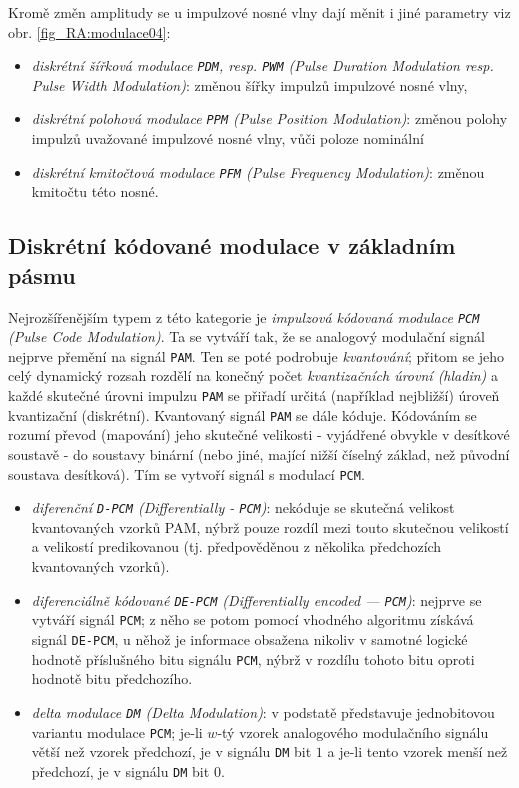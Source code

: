       Kromě změn amplitudy se u impulzové nosné vlny dají měnit i jiné parametry viz obr. 
      \ref{fig_RA:modulace04}:
      \begin{itemize}
        \item \emph{diskrétní šířková modulace \texttt{PDM}, resp. \texttt{PWM} (Pulse Duration  
              Modulation resp. Pulse Width Modulation)}: změnou šířky impulzů impulzové nosné vlny,
        \item \emph{diskrétní polohová modulace \texttt{PPM} (Pulse Position Modulation)}: změnou  
              polohy impulzů uvažované impulzové nosné vlny, vůči poloze nominální
        \item \emph{diskrétní kmitočtová modulace \texttt{PFM} (Pulse Frequency Modulation)}:  
              změnou kmitočtu této nosné.
      \end{itemize} 
    \subsection{Diskrétní kódované modulace v základním pásmu}
      Nejrozšířenějším typem z této kategorie je \emph{impulzová kódovaná modulace \texttt{PCM} 
      (Pulse Code Modulation)}. Ta se vytváří tak, že se analogový modulační signál nejprve přemění 
      na signál \texttt{PAM}. Ten se poté podrobuje \emph{kvantování}; přitom se jeho celý 
      dynamický rozsah rozdělí na konečný počet \emph{kvantizačních úrovní (hladin)} a každé 
      skutečné úrovni impulzu \texttt{PAM} se přiřadí určitá (například nejbližší) úroveň 
      kvantizační (diskrétní). Kvantovaný signál \texttt{PAM} se dále kóduje. Kódováním se rozumí 
      převod (mapování) jeho skutečné velikosti - vyjádřené obvykle v desítkové soustavě - do 
      soustavy binární (nebo jiné, mající nižší číselný základ, než původní soustava desítková). 
      Tím se vytvoří signál s modulací \texttt{PCM}.
      \begin{itemize}
        \item \emph{diferenční \texttt{D-PCM} (Differentially - \texttt{PCM})}: nekóduje se 
              skutečná velikost kvantovaných vzorků PAM, nýbrž pouze rozdíl mezi touto skutečnou 
              velikostí a velikostí predikovanou (tj. předpověděnou z několika předchozích 
              kvantovaných vzorků).
        \item \emph{diferenciálně kódované \texttt{DE-PCM} (Differentially encoded —
              \texttt{PCM})}: nejprve se vytváří signál \texttt{PCM}; z něho se potom pomocí 
              vhodného algoritmu získává signál \texttt{DE-PCM}, u něhož je informace obsažena 
              nikoliv v samotné logické hodnotě příslušného bitu signálu \texttt{PCM}, nýbrž v 
              rozdílu tohoto bitu oproti hodnotě bitu předchozího.
        \item \emph{delta modulace \texttt{DM} (Delta Modulation)}: v podstatě představuje   
              jednobitovou variantu modulace \texttt{PCM}; je-li \(w\)-tý vzorek analogového 
              modulačního signálu větší než vzorek předchozí, je v signálu \texttt{DM} bit \(1\) a 
              je-li tento vzorek menší než předchozí, je v signálu \texttt{DM} bit \(0\).
      \end{itemize}
      
